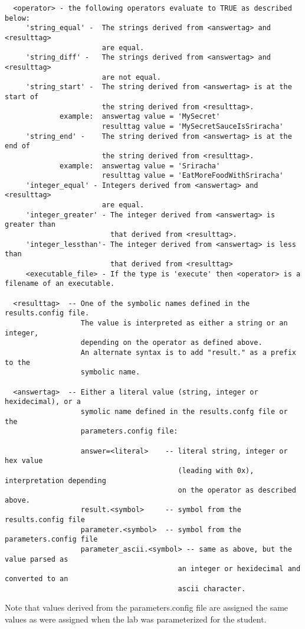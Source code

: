 \documentclass{article}
\begin{document}
\begin{verbatim}
  <operator> - the following operators evaluate to TRUE as described below:
     'string_equal' -  The strings derived from <answertag> and <resulttag>
                       are equal.
     'string_diff' -   The strings derived from <answertag> and <resulttag>
                       are not equal.
     'string_start' -  The string derived from <answertag> is at the start of 
                       the string derived from <resulttag>.
             example:  answertag value = 'MySecret'
                       resulttag value = 'MySecretSauceIsSriracha'
     'string_end' -    The string derived from <answertag> is at the end of
                       the string derived from <resulttag>.
             example:  answertag value = 'Sriracha'
                       resulttag value = 'EatMoreFoodWithSriracha'
     'integer_equal' - Integers derived from <answertag> and <resulttag>
                       are equal.
     'integer_greater' - The integer derived from <answertag> is greater than
                         that derived from <resulttag>.
     'integer_lessthan'- The integer derived from <answertag> is less than
                         that derived from <resulttag>
     <executable_file> - If the type is 'execute' then <operator> is a filename of an executable.
               
  <resulttag>  -- One of the symbolic names defined in the results.config file.
                  The value is interpreted as either a string or an integer,
                  depending on the operator as defined above. 
                  An alternate syntax is to add "result." as a prefix to the
                  symbolic name.
         
  <answertag>  -- Either a literal value (string, integer or hexidecimal), or a 
                  symolic name defined in the results.confg file or the 
                  parameters.config file:
 
                  answer=<literal>    -- literal string, integer or hex value 
                                         (leading with 0x), interpretation depending 
                                         on the operator as described above.
                  result.<symbol>     -- symbol from the results.config file
                  parameter.<symbol>  -- symbol from the parameters.config file
                  parameter_ascii.<symbol> -- same as above, but the value parsed as 
                                         an integer or hexidecimal and converted to an 
                                         ascii character.

\end{verbatim}
         Note that values derived from the parameters.config file are assigned the same values as
         were assigned when the lab was parameterized for the student.
\end{document}
